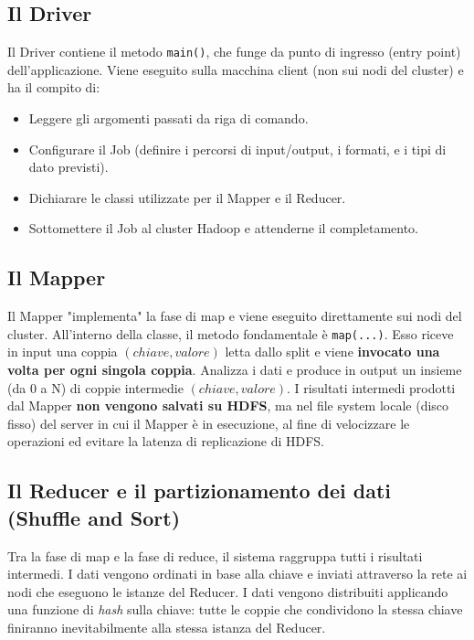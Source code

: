 \subsection{Il Driver}
Il Driver contiene il metodo \texttt{main()}, che funge da punto di ingresso (entry point) dell'applicazione. Viene eseguito sulla macchina client (non sui nodi del cluster) e ha il compito di:
\begin{itemize}
    \item Leggere gli argomenti passati da riga di comando.
    \item Configurare il Job (definire i percorsi di input/output, i formati, e i tipi di dato previsti).
    \item Dichiarare le classi utilizzate per il Mapper e il Reducer.
    \item Sottomettere il Job al cluster Hadoop e attenderne il completamento.
\end{itemize}

\subsection{Il Mapper}
Il Mapper "implementa" la fase di map e viene eseguito direttamente sui nodi del cluster. All'interno della classe, il metodo fondamentale è \texttt{map(...)}. 
Esso riceve in input una coppia \((chiave, valore)\) letta dallo split e viene \textbf{invocato una volta per ogni singola coppia}. Analizza i dati e produce in output un insieme (da 0 a N) di coppie intermedie \((chiave, valore)\).
I risultati intermedi prodotti dal Mapper \textbf{non vengono salvati su HDFS}, ma nel file system locale (disco fisso) del server in cui il Mapper è in esecuzione, al fine di velocizzare le operazioni ed evitare la latenza di replicazione di HDFS.

\subsection{Il Reducer e il partizionamento dei dati (Shuffle and Sort)}
Tra la fase di map e la fase di reduce, il sistema raggruppa tutti i risultati intermedi. I dati vengono ordinati in base alla chiave e inviati attraverso la rete ai nodi che eseguono le istanze del Reducer.
I dati vengono distribuiti applicando una funzione di \textit{hash} sulla chiave: tutte le coppie che condividono la stessa chiave finiranno inevitabilmente alla stessa istanza del Reducer.

